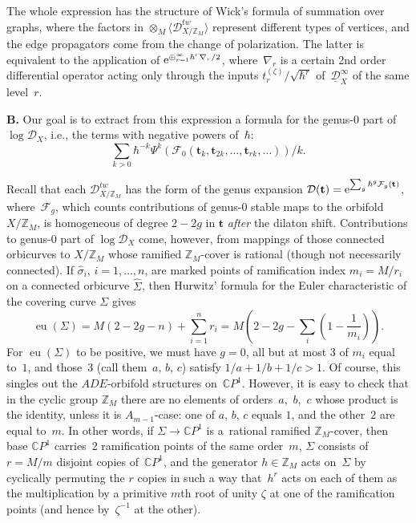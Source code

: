 \documentclass[pdftex]{sigma}
\def\D{\mathcal D}
\def\F{\mathcal F}
\def\ZZ{\mathbb Z}
\def\CC{\mathbb C}
\def\hat{\widehat}
\def\t{{\mathbf t}}
\def\gs{\sigma}
\def\h{\hbar}
\def\lan{\langle}
\def\ran{\rangle}
\def\eu{\operatorname{eu}}
\def\und{\underline}
\begin{document}
The whole expression has the structure of Wick's formula of summation over graphs, where the factors in $\otimes_M \lan \D_{X/\ZZ_M}^{tw}\ran$ represent
different types of vertices, and the edge propagators come from the change of polarization. The latter is equivalent to the application of
${\rm e}^{\oplus_{r=1}^{\infty} \h^r \nabla_r/2}$, where~$\nabla_r$ is a certain 2nd order
differential operator acting only through the inputs
$t_r^{(\zeta)}/\sqrt{\h^r}$ of~$\und{\D}_X^{\infty}$ of the same level~$r$.

{\bf B.} Our goal is to extract from this expression a formula for the genus-$0$ part of $\log \D_X$, i.e., the terms with negative powers of~$\h$:
\[ \sum_{k>0} \h^{-k}\Psi^k(\F_0(\t_k,\t_{2k},\dots,\t_{rk},\dots))/k.\]

Recall that each $\D_{X/\ZZ_M}^{tw}$ has the form of the genus expansion $\D (\t) = {\rm e}^{\sum_g \h^g \F_g(\t)}$, where~$\F_g$, which counts contributions of genus-$0$ stable maps to the orbifold $X/\ZZ_M$, is homogeneous of degree $2-2g$ in $\t$ {\em after} the dilaton shift. Contributions to genus-0 part of $\log \D_X$ come, however, from mappings of those connected orbicurves to $X/\ZZ_M$ whose ramified $\ZZ_M$-cover is rational (though not necessarily connected). If $\hat{\gs}_i$, $i=1,\dots, n$, are marked points of ramification index $m_i=M/r_i$ on a connected orbicurve $\hat{\Sigma}$, then Hurwitz' formula for the Euler characteristic of the covering curve $\Sigma$ gives
\[ \eu (\Sigma) = M (2-2g-n)+\sum_{i=1}^n r_i =
M \left( 2-2g - \sum_i \left(1-\frac{1}{m_i}\right)\right).\]
For $\eu (\Sigma)$ to be positive, we must have $g=0$, all but at most $3$ of $m_i$ equal to~$1$, and those~$3$ (call them~$a$, $b$, $c$) satisfy $1/a+1/b+1/c>1$.
Of course, this singles out the $ADE$-orbifold structures on~$\CC P^1$. However, it is easy to check that in the cyclic group $\ZZ_M$ there are no elements of
orders~$a$,~$b$,~$c$ whose product is the identity, unless it is $A_{m-1}$-case: one of $a$, $b$, $c$ equals $1$, and the other~$2$ are equal to~$m$. In other words, if $\Sigma \to \CC P^1$ is a~rational ramified $\ZZ_M$-cover, then base $\CC P^1$ carries~2 ramification points of the same order~$m$, $\Sigma$ consists of $r=M/m$ disjoint copies of~$\CC P^1$, and the generator $h\in \ZZ_M$ acts on~$\Sigma$ by cyclically permuting the $r$ copies in such a way that~$h^r$ acts on each of them as the multiplication by a primitive $m$th root of unity $\zeta$ at one of the ramification points (and hence by~$\zeta^{-1}$ at the other).
\end{document}
